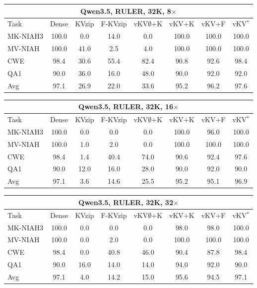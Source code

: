 \begin{tabular}{lccccccc}
\toprule
\multicolumn{8}{c}{Qwen3.5, RULER, 32K, 8$\times$} \\
\midrule
Task & Dense & KVzip & F-KVzip & vKV$\emptyset$+K & vKV+K & vKV+F & vKV$^\ast$ \\
\midrule
MK-NIAH3 & 100.0 & 0.0 & 14.0 & 0.0 & 100.0 & 100.0 & 100.0 \\
MV-NIAH & 100.0 & 41.0 & 2.5 & 4.0 & 100.0 & 100.0 & 100.0 \\
CWE & 98.4 & 30.6 & 55.4 & 82.4 & 90.8 & 92.6 & 98.4 \\
QA1 & 90.0 & 36.0 & 16.0 & 48.0 & 90.0 & 92.0 & 92.0 \\
\midrule
Avg & 97.1 & 26.9 & 22.0 & 33.6 & 95.2 & 96.2 & 97.6 \\
\bottomrule
\end{tabular}
\vspace{0.8em}

\begin{tabular}{lccccccc}
\toprule
\multicolumn{8}{c}{Qwen3.5, RULER, 32K, 16$\times$} \\
\midrule
Task & Dense & KVzip & F-KVzip & vKV$\emptyset$+K & vKV+K & vKV+F & vKV$^\ast$ \\
\midrule
MK-NIAH3 & 100.0 & 0.0 & 0.0 & 0.0 & 100.0 & 96.0 & 100.0 \\
MV-NIAH & 100.0 & 1.0 & 2.0 & 0.0 & 100.0 & 100.0 & 100.0 \\
CWE & 98.4 & 1.4 & 40.4 & 74.0 & 90.6 & 92.4 & 97.6 \\
QA1 & 90.0 & 12.0 & 16.0 & 28.0 & 90.0 & 92.0 & 90.0 \\
\midrule
Avg & 97.1 & 3.6 & 14.6 & 25.5 & 95.2 & 95.1 & 96.9 \\
\bottomrule
\end{tabular}
\vspace{0.8em}

\begin{tabular}{lccccccc}
\toprule
\multicolumn{8}{c}{Qwen3.5, RULER, 32K, 32$\times$} \\
\midrule
Task & Dense & KVzip & F-KVzip & vKV$\emptyset$+K & vKV+K & vKV+F & vKV$^\ast$ \\
\midrule
MK-NIAH3 & 100.0 & 0.0 & 0.0 & 0.0 & 98.0 & 98.0 & 100.0 \\
MV-NIAH & 100.0 & 0.0 & 2.0 & 0.0 & 100.0 & 100.0 & 100.0 \\
CWE & 98.4 & 0.0 & 40.8 & 46.0 & 90.4 & 87.8 & 98.4 \\
QA1 & 90.0 & 16.0 & 14.0 & 14.0 & 94.0 & 92.0 & 90.0 \\
\midrule
Avg & 97.1 & 4.0 & 14.2 & 15.0 & 95.6 & 94.5 & 97.1 \\
\bottomrule
\end{tabular}
\vspace{0.8em}

